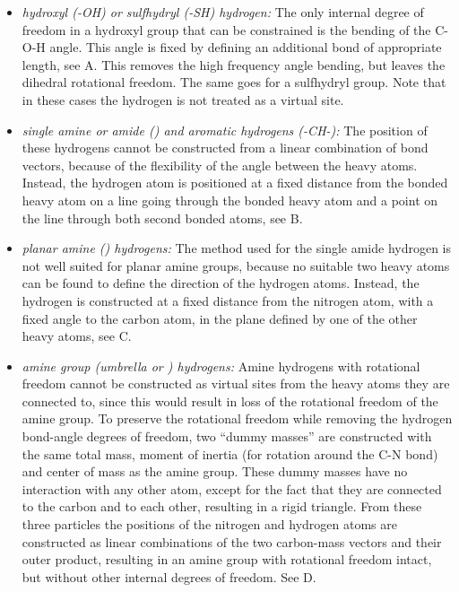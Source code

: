 \begin{itemize}

\item{\em hydroxyl ({\sf -OH}) or sulfhydryl ({\sf -SH})
hydrogen:\/} The only internal degree of freedom in a hydroxyl group
that can be constrained is the bending of the {\sf C-O-H} angle. This
angle is fixed by defining an additional bond of appropriate length,
see A. This removes the high frequency angle bending,
but leaves the dihedral rotational freedom. The same goes for a
sulfhydryl group. Note that in these cases the hydrogen is not treated
as a virtual site.

\item{\em single amine or amide ({\amines}) and aromatic hydrogens
({\sf -CH-}):\/} The position of these hydrogens cannot be constructed
from a linear combination of bond vectors, because of the flexibility
of the angle between the heavy atoms. Instead, the hydrogen atom is
positioned at a fixed distance from the bonded heavy atom on a line
going through the bonded heavy atom and a point on the line through
both second bonded atoms, see B.

\item{\em planar amine ({\amine}) hydrogens:\/} The method used for
the single amide hydrogen is not well suited for planar amine groups,
because no suitable two heavy atoms can be found to define the
direction of the hydrogen atoms. Instead, the hydrogen is constructed
at a fixed distance from the nitrogen atom, with a fixed angle to the
carbon atom, in the plane defined by one of the other heavy atoms, see
C.

\item{\em amine group (umbrella {\amine} or {\aminep}) hydrogens:\/}
Amine hydrogens with rotational freedom cannot be constructed as virtual
sites from the heavy atoms they are connected to, since this would
result in loss of the rotational freedom of the amine group. To
preserve the rotational freedom while removing the hydrogen bond-angle
degrees of freedom, two ``dummy masses'' are constructed with the same
total mass, moment of inertia (for rotation around the {\sf C-N} bond)
and center of mass as the amine group. These dummy masses have no
interaction with any other atom, except for the fact that they are
connected to the carbon and to each other, resulting in a rigid
triangle. From these three particles the positions of the nitrogen and
hydrogen atoms are constructed as linear combinations of the two
carbon-mass vectors and their outer product, resulting in an amine
group with rotational freedom intact, but without other internal
degrees of freedom. See D.

\end{itemize}

